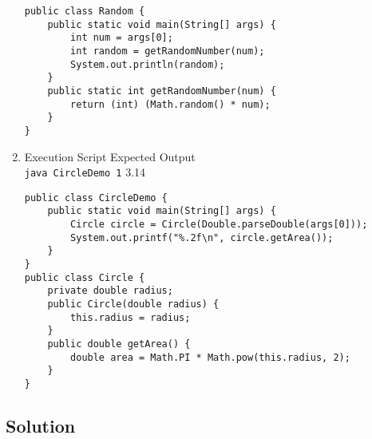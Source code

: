 \documentclass[12pt,letterpaper,twoside]{article}
\begin{document}
\begin{enumerate}[label=\textbf{(\alph*)}]
\begin{lstlisting}
public class Random {
	public static void main(String[] args) {
		int num = args[0];
		int random = getRandomNumber(num);
		System.out.println(random);
	}
	public static int getRandomNumber(num) {
		return (int) (Math.random() * num);
	}
}
\end{lstlisting}

\newpage

\item Execution Script \hfill Expected Output\\
\texttt{java CircleDemo 1} \hfill 3.14

\begin{lstlisting}
public class CircleDemo {
	public static void main(String[] args) {
		Circle circle = Circle(Double.parseDouble(args[0]));
		System.out.printf("%.2f\n", circle.getArea());
	}
}
public class Circle {
	private double radius;
	public Circle(double radius) {
		this.radius = radius;
	}
	public double getArea() {
		double area = Math.PI * Math.pow(this.radius, 2);
	}
}
\end{lstlisting}

\end{enumerate}

\subsection*{Solution}
\end{document}
